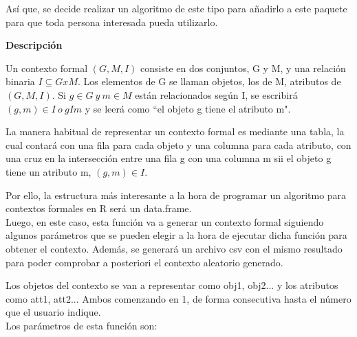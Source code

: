     As\'i que, se decide realizar un algoritmo de este tipo para a\~nadirlo a este paquete para que toda persona interesada pueda 
    utilizarlo.
    

    \textbf{Descripci\'on}

    Un contexto formal \( (G, M, I) \) consiste en dos conjuntos, G y M, y una relaci\'on binaria \( I \subseteq G x M \). Los elementos 
    de G se llaman objetos, los de M, atributos de \( (G, M, I) \). Si \(g \in G ~ y ~ m \in M \) est\'an relacionados seg\'un I, se escribir\'a 
    \( (g,m) \in I ~ o ~ g I m \) y se leer\'a como ``el objeto g tiene el atributo m".\cite{ganter}


    La manera habitual de representar un contexto formal es mediante una tabla, la cual contar\'a con una fila para cada objeto y una columna 
    para cada atributo, con una cruz en la intersecci\'on entre una fila g con una columna m sii el objeto g tiene un atributo m, \( (g,m) \in 
    I \).

    Por ello, la estructura m\'as interesante a la hora de programar un algoritmo para contextos formales en R ser\'a un data.frame.
    \\


    Luego, en este caso, esta funci\'on va a generar un contexto formal siguiendo algunos par\'ametros que se pueden elegir a la 
    hora de ejecutar dicha funci\'on para obtener el contexto. Adem\'as, se generar\'a 
    un archivo csv con el mismo resultado para poder comprobar a posteriori el contexto aleatorio generado.

    Los objetos del contexto se van a representar como obj1, obj2... y los atributos como att1, att2... Ambos comenzando en 1, de forma 
    consecutiva hasta el n\'umero que el usuario indique.
    \\

    Los par\'ametros de esta funci\'on son:

